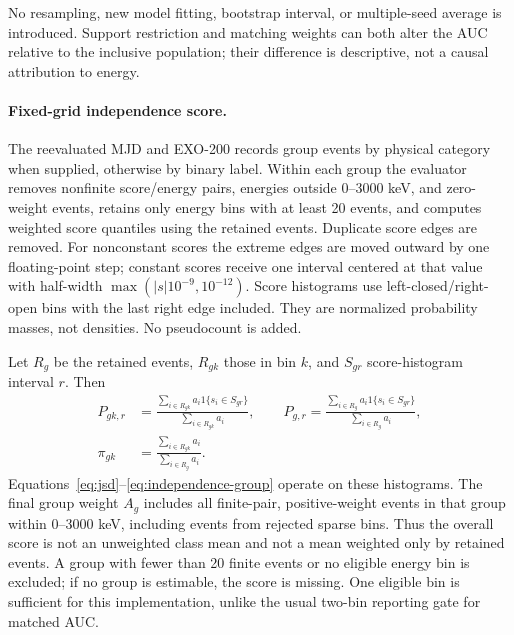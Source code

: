 



No resampling, new model fitting, bootstrap interval, or multiple-seed average
is introduced. Support restriction and matching weights can both alter the
AUC relative to the inclusive population; their difference is descriptive,
not a causal attribution to energy.

\paragraph{Fixed-grid independence score.}
The reevaluated MJD and EXO-200 records group events by physical category when supplied, otherwise by
binary label. Within each group the evaluator removes nonfinite
score/energy pairs, energies outside 0--3000 keV, and zero-weight events, retains only
energy bins with at
least 20 events, and computes weighted score quantiles using the retained
events. Duplicate score edges are removed. For nonconstant scores the extreme
edges are moved outward by one floating-point step; constant scores receive
one interval centered at that value with half-width
$\max(|s|10^{-9},10^{-12})$. Score histograms use left-closed/right-open bins
with the last right edge included. They are normalized probability masses,
not densities. No pseudocount is added.

Let $R_g$ be the retained events, $R_{gk}$ those in bin $k$, and $S_{gr}$
score-histogram interval $r$. Then
\begin{align}
 P_{gk,r}&=\frac{\sum_{i\in R_{gk}}a_i\mathrm{1}\{s_i\in S_{gr}\}}
 {\sum_{i\in R_{gk}}a_i},\qquad
 P_{g,r}=\frac{\sum_{i\in R_g}a_i\mathrm{1}\{s_i\in S_{gr}\}}
 {\sum_{i\in R_g}a_i},\label{eq:score-histograms}\\
 \pi_{gk}&=\frac{\sum_{i\in R_{gk}}a_i}{\sum_{i\in R_g}a_i}.
\end{align}
Equations~\ref{eq:jsd}--\ref{eq:independence-group} operate on these
histograms. The final group weight $A_g$ includes all finite-pair, positive-weight
events in that group within 0--3000 keV, including events from rejected sparse bins. Thus
the overall score is not an unweighted class mean and not a mean weighted
only by retained events. A group with fewer than 20 finite events or no
eligible energy bin is excluded; if no group is estimable, the score is
missing. One eligible bin is sufficient for this implementation, unlike
the usual two-bin reporting gate for matched AUC.

